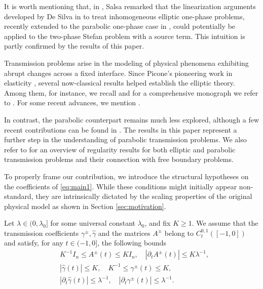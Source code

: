 \documentclass[12pt]{article}
\numberwithin{Theorem}{section}
\theoremstyle{definition}
\theoremstyle{remark}
\numberwithin{equation}{section}
\newcommand{\p}{\partial}
\begin{document}
It is worth mentioning that, in \cite[Open problem 7]{salsa2012two}, Salsa remarked that the linearization arguments developed by De Silva in \cite{DeSilva2011} to treat inhomogeneous elliptic one-phase problems, recently extended to the parabolic one-phase case in \cite{DFS23}, could potentially be applied to the two-phase Stefan problem with a source term. This intuition is partly confirmed by the results of this paper.



Transmission problems arise in the modeling of physical phenomena exhibiting abrupt changes across a fixed interface. 
Since Picone’s pioneering work in elasticity \cite{picone1954probleme},
several now-classical results helped establish the elliptic theory.
Among them, for instance, we recall \cite{Campanato,Lions,Schechter,Stampacchia}
and for a comprehensive monograph we refer to \cite{Borsuk}.
For some  recent advances, we mention
\cite{LiVogelius,LiNirenberg,CittiFerrari,DFSFully,desilva2018,CSS_Trans,soria2023regularity,GJ_transmission,erneta2026regularity}.

In contrast, the parabolic counterpart remains much less explored, although a few recent contributions can be found in \cite{jesus2026fully,KS}. The results in this paper represent a further step in the understanding of parabolic transmission problems.  We also refer to \cite{bianca2022transmission,Pini2025Transmission} for an overview of regularity results for both elliptic and parabolic transmission problems and their connection with free boundary problems.



To properly frame our contribution, we  introduce the structural hypotheses on the coefficients of \eqref{eq:main1}. While these conditions might initially appear non-standard, they are intrinsically dictated by the scaling properties of the original physical model as shown in Section \ref{sec:motivation}. 

Let $ \lambda \in (0,\lambda_0]$ for some universal constant $\lambda_0$, and fix $K\geq1$.
We assume that the transmission coefficients $\gamma^\pm, \hat{\gamma}$ and the matrices $A^{\pm}$ belong to $C_t^{0,1}([-1,0])$ and satisfy, for any $t \in (-1,0]$, the following bounds
\begin{equation}
\begin{aligned} \label{Assump1}
&K^{-1} I_n\leq  A^{\pm}(t) \leq K I_n, \quad |{\p_t} A^{\pm}(t)| \leq K \lambda^{-1},\\
&|\hat \gamma(t)| \leq K, \quad K^{-1}\leq \gamma^{\pm}(t) \leq K, \\
&|{\p_t}\hat \gamma(t)| \leq \lambda^{-1}, \quad | {\p_t}\gamma^{\pm}(t)| \leq \lambda^{-1}.
\end{aligned}
\end{equation}
\end{document}
